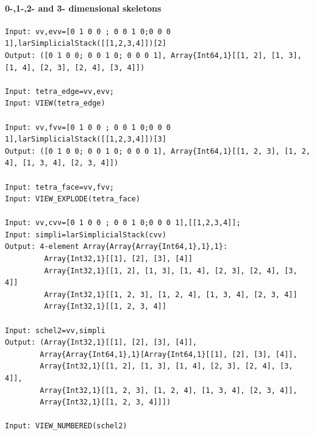 \documentclass{article}
\begin{document}
\paragraph{0-,1-,2- and 3- dimensional skeletons}
\begin{flushleft} \small

\begin{list}{}{} \item
   \begin{Verbatim}[tabsize=4]
Input: vv,evv=[0 1 0 0 ; 0 0 1 0;0 0 0 1],larSimplicialStack([[1,2,3,4]])[2]
Output: ([0 1 0 0; 0 0 1 0; 0 0 0 1], Array{Int64,1}[[1, 2], [1, 3], [1, 4], [2, 3], [2, 4], [3, 4]])

Input: tetra_edge=vv,evv;
Input: VIEW(tetra_edge)

Input: vv,fvv=[0 1 0 0 ; 0 0 1 0;0 0 0 1],larSimplicialStack([[1,2,3,4]])[3]
Output: ([0 1 0 0; 0 0 1 0; 0 0 0 1], Array{Int64,1}[[1, 2, 3], [1, 2, 4], [1, 3, 4], [2, 3, 4]])

Input: tetra_face=vv,fvv;
Input: VIEW_EXPLODE(tetra_face)

Input: vv,cvv=[0 1 0 0 ; 0 0 1 0;0 0 0 1],[[1,2,3,4]];
Input: simpli=larSimplicialStack(cvv)
Output: 4-element Array{Array{Array{Int64,1},1},1}:
         Array{Int32,1}[[1], [2], [3], [4]]
         Array{Int32,1}[[1, 2], [1, 3], [1, 4], [2, 3], [2, 4], [3, 4]]
         Array{Int32,1}[[1, 2, 3], [1, 2, 4], [1, 3, 4], [2, 3, 4]]
         Array{Int32,1}[[1, 2, 3, 4]]

Input: schel2=vv,simpli
Output: (Array{Int32,1}[[1], [2], [3], [4]],
        Array{Array{Int64,1},1}[Array{Int64,1}[[1], [2], [3], [4]],
        Array{Int32,1}[[1, 2], [1, 3], [1, 4], [2, 3], [2, 4], [3, 4]],
        Array{Int32,1}[[1, 2, 3], [1, 2, 4], [1, 3, 4], [2, 3, 4]],
        Array{Int32,1}[[1, 2, 3, 4]]])

Input: VIEW_NUMBERED(schel2)
   \end{Verbatim}
\end{list}
\end{flushleft}
\end{document}
